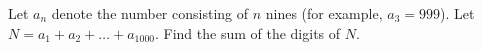 Let $a_{n}$ denote the number consisting of $n$ nines (for example, $a_{3}=999$). Let $N=a_{1}+a_{2}+\ldots+a_{1000}$. Find the sum of the digits of $N$.
